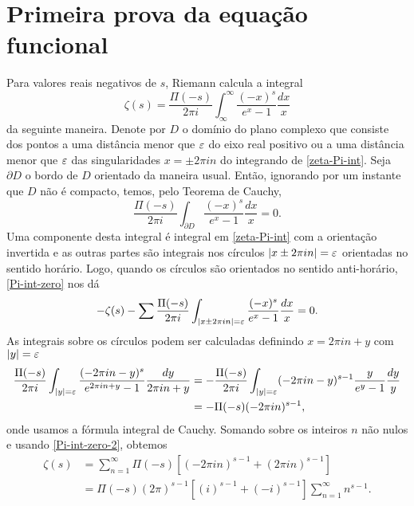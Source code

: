     
    \section{Primeira prova da equação funcional}
    
    
    Para valores reais negativos de $s$, Riemann calcula a integral
    \begin{equation}
        \label{zeta-Pi-int}
        \zeta(s) = \frac{\Pi(-s)}{2\pi i} \int_{\infty}^{\infty} \frac{(-x)^s}{e^x - 1} \frac{dx}{x}
    \end{equation}
    da seguinte maneira. Denote por $D$ o domínio do plano complexo que consiste dos pontos a uma distância menor que $\varepsilon$ do eixo real positivo ou a uma distância menor que $\varepsilon$ das singularidades $x = \pm 2 \pi i n$ do integrando de \eqref{zeta-Pi-int}. Seja $\partial D$ o bordo de $D$ orientado da maneira usual. Então, ignorando por um instante que $D$ não é compacto, temos, pelo Teorema de Cauchy, 
    \begin{equation}
        \label{Pi-int-zero}
        \frac{\Pi(-s)}{2\pi i} \int_{\partial D} \frac{(-x)^s}{e^x - 1} \frac{dx}{x} = 0.
    \end{equation}
    Uma componente desta integral é integral em \eqref{zeta-Pi-int} com a orientação invertida e as outras partes são integrais nos círculos $|x \pm 2\pi i n| = \varepsilon$ orientadas no sentido horário. Logo, quando os círculos são orientados no sentido anti-horário, \eqref{Pi-int-zero} nos dá
    \begin{equation}
        \label{Pi-int-zero-2}
        -\zeta(s) - \sum \frac{\Pi(-s)}{2\pi i} \int_{|x \pm 2\pi i n| = \varepsilon} \frac{(-x)^s}{e^x - 1} \frac{dx}{x} = 0.
    \end{equation}
    As integrais sobre os círculos podem ser calculadas definindo $x = 2\pi i n + y$ com $|y| = \varepsilon$
    \begin{align*}
        \frac{\Pi(-s)}{2\pi i} \int_{|y| = \varepsilon} \frac{(-2 \pi i n - y)^s}{e^{2 \pi i n + y} - 1} \frac{dy}{2\pi i n + y} 
        &=
        -\frac{\Pi(-s)}{2\pi i} \int_{|y| = \varepsilon} (-2 \pi i n - y)^{s-1} \frac{y}{e^y - 1} \frac{dy}{y} \\
        &= - \Pi(-s)(-2\pi i n)^{s-1},
    \end{align*}
    onde usamos a fórmula integral de Cauchy. Somando sobre os inteiros $n$ não nulos e usando \eqref{Pi-int-zero-2}, obtemos
    \begin{align*}
        \zeta(s) &= \sum_{n=1}^{\infty} \Pi(-s)[(-2\pi i n)^{s-1} + (2\pi i n)^{s-1}] \\
        &= \Pi(-s)(2\pi)^{s-1}[(i)^{s-1} + (-i)^{s-1}] \sum_{n=1}^{\infty} n^{s-1}.
    \end{align*}
